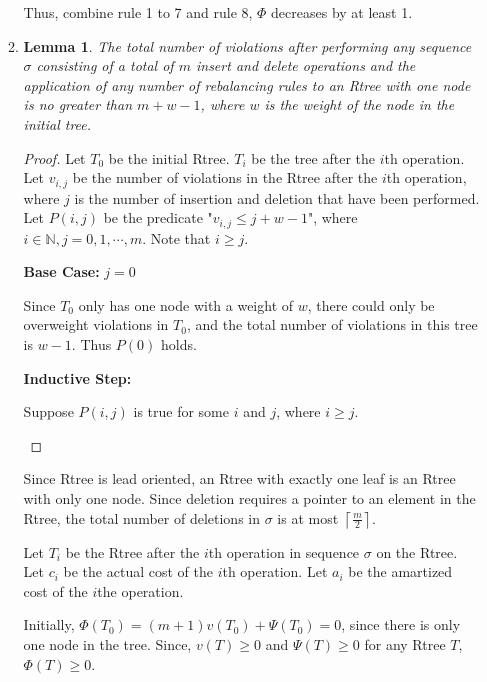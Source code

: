 \documentclass[10pt]{article}
\newtheorem{lemma}[theorem]{Lemma}
\begin{document}
\begin{enumerate}
\begin{enumerate}
				Thus, combine rule 1 to 7 and rule 8, $\Phi$ decreases by at least 1.
			
			\item %
				\begin{lemma}
					The total number of violations after performing any
					sequence $\sigma$ consisting of a total of $m$ insert
					and delete operations and the application of any number of
					rebalancing rules to an Rtree with one node is no greater
					than $m+w-1$, where $w$ is the weight of the node in the
					initial tree.
				\end{lemma}
				\begin{proof}
					Let $T_0$ be the initial Rtree.
					$T_i$ be the tree after the $i$th operation.
					Let $v_{i,j}$ be the number of violations in the Rtree after the
					$i$th operation, where $j$ is the number of insertion and
					deletion that have been performed. 
					Let $P(i,j)$ be the predicate "$v_{i,j} \leq j+w-1$", where $i
					\in \mathbb{N}, j = 0, 1, \cdots, m$.
					Note that $i \geq j$.
					
					\textbf{Base Case:} $j=0$
					\begin{addmargin}[1em]{0em}
						Since $T_0$ only has one node with a weight of $w$,
						there could only be overweight violations in $T_0$, and
						the total number of violations in this tree is $w-1$.
						Thus $P(0)$ holds.
					\end{addmargin}

					\textbf{Inductive Step:}
					\begin{addmargin}[1em]{0em}
						Suppose $P(i, j)$ is true for some $i$ and $j$, where
						$i \geq j$. 

					\end{addmargin}

				\end{proof}

				Since Rtree is lead oriented, an Rtree with exactly one leaf is an Rtree with only one node.
				Since deletion requires a pointer to an element in the Rtree, the total number of deletions in $\sigma$ is at most $\left\lceil \frac{m}{2} \right\rceil$.
				
				Let $T_i$ be the Rtree after the $i$th operation in sequence $\sigma$ on the Rtree.
				Let $c_i$ be the actual cost of the $i$th operation.
				Let $a_i$ be the amartized cost of the $i$the operation.

				Initially, $\Phi(T_0) = (m+1)v(T_0) + \Psi(T_0) = 0$, since there is only one node in the tree.
				Since, $v(T) \geq 0$ and $\Psi(T) \geq 0$ for any Rtree $T$, $\Phi(T) \geq 0$. 


\end{enumerate}
\end{enumerate}
\end{document}
